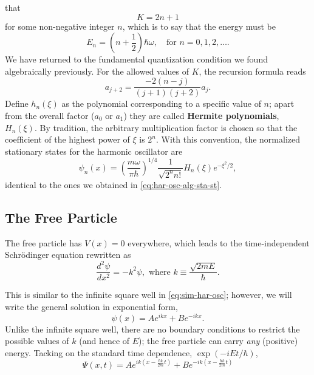 \documentclass{article}
\begin{document}
that \[
  K = 2n + 1
\] for some non-negative integer $n$, which is to say that the energy must be
\begin{equation} \label{eq:har-osc-ana-ene}
  E_n = \left(n + \frac{1}{2}\right)\hbar\omega, \quad
  \text{for } n = 0, 1, 2, \ldots.
\end{equation}
We have returned to the fundamental quantization condition we found
algebraically previously. For the allowed values of $K$, the recursion formula
reads
\begin{equation} \label{eq:har-osc-ana-a-2}
  a_{j+2} = \frac{-2(n - j)}{(j+1)(j+2)}a_j.
\end{equation}
Define $h_n(\xi)$ as the polynomial corresponding to a specific value of $n$;
apart from the overall factor ($a_0$ or $a_1$) they are called \textbf{Hermite
polynomials}, $H_n(\xi)$. By tradition, the arbitrary multiplication factor is
chosen so that the coefficient of the highest power of $\xi$ is $2^n$. With
this convention, the normalized stationary states for the harmonic oscillator
are
\begin{equation} \label{eq:har-osc-ana-sta-st}
  \boxed{
    \psi_n(x) = \left(\frac{m\omega}{\pi\hbar}\right)^{1/4}
    \frac{1}{\sqrt{2^nn!}}H_n(\xi)e^{-\xi^2/2},
  }
\end{equation}
identical to the ones we obtained in \eqref{eq:har-osc-alg-sta-st}.

\subsection{The Free Particle}

The free particle has $V(x) = 0$ everywhere, which leads to the
time-independent Schr\"{o}dinger equation rewritten as
\begin{equation} \label{eq:free-par}
  \frac{d^2\psi}{dx^2} = -k^2\psi,
  \text{ where } k \equiv \frac{\sqrt{2mE}}{\hbar}.
\end{equation}

This is similar to the infinite square well in \eqref{eq:sim-har-osc}; however,
we will write the general solution in exponential form,
\begin{equation} \label{eq:free-par-1}
  \psi(x) = Ae^{ikx} + Be^{-ikx}.
\end{equation}
Unlike the infinite square well, there are no boundary conditions to restrict
the possible values of $k$ (and hence of $E$); the free particle can carry
\emph{any} (positive) energy. Tacking on the standard time dependence,
$\exp(-iEt/\hbar)$,
\begin{equation} \label{eq:free-par-2}
  \Psi(x, t)
  = Ae^{ik(x - \frac{\hbar k}{2m}t)} + Be^{-ik(x - \frac{\hbar k}{2m}t)}
\end{equation}
\end{document}
